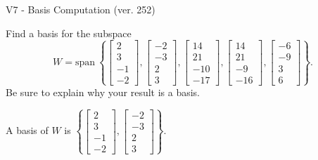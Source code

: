 \begin{exercise}
  \begin{exerciseTitle}V7 - Basis Computation (ver. 252)\end{exerciseTitle}
  \begin{exerciseStatement}
    Find a basis for the subspace 
\[W=\mathrm{span}\ \left\{\left[\begin{array}{r}
2 \\
3 \\
-1 \\
-2
\end{array}\right] , \left[\begin{array}{r}
-2 \\
-3 \\
2 \\
3
\end{array}\right] , \left[\begin{array}{r}
14 \\
21 \\
-10 \\
-17
\end{array}\right] , \left[\begin{array}{r}
14 \\
21 \\
-9 \\
-16
\end{array}\right] , \left[\begin{array}{r}
-6 \\
-9 \\
3 \\
6
\end{array}\right]\right\}.\]
 Be sure to explain why your result is a basis.


  \end{exerciseStatement}
  \begin{exerciseAnswer}
   A basis of \(W\) is  \(\left\{\left[\begin{array}{r}
2 \\
3 \\
-1 \\
-2
\end{array}\right] , \left[\begin{array}{r}
-2 \\
-3 \\
2 \\
3
\end{array}\right]\right\}\).
  


  \end{exerciseAnswer}
\end{exercise}